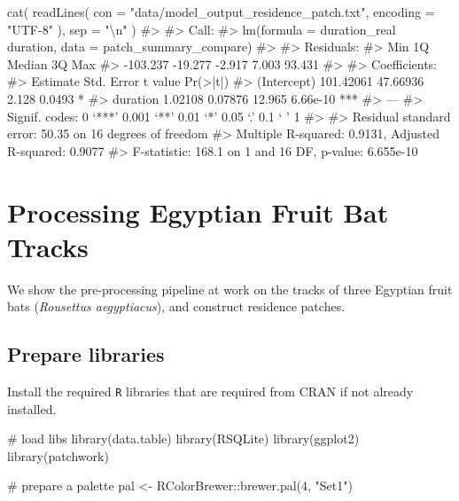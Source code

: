 \documentclass[]{scrreprt}
\newenvironment{Shaded}{}{}
\newcommand{\CharTok}[1]{\textcolor[rgb]{0.00,0.50,0.50}{#1}}
\newcommand{\CommentTok}[1]{\textcolor[rgb]{0.00,0.50,0.00}{#1}}
\newcommand{\DataTypeTok}[1]{#1}
\newcommand{\DecValTok}[1]{#1}
\newcommand{\KeywordTok}[1]{\textcolor[rgb]{0.00,0.00,1.00}{#1}}
\newcommand{\NormalTok}[1]{#1}
\newcommand{\OperatorTok}[1]{#1}
\newcommand{\StringTok}[1]{\textcolor[rgb]{0.00,0.50,0.50}{#1}}
\begin{document}
\begin{Shaded}
\begin{Highlighting}[]
\KeywordTok{cat}\NormalTok{(}
  \KeywordTok{readLines}\NormalTok{(}
    \DataTypeTok{con =} \StringTok{"data/model_output_residence_patch.txt"}\NormalTok{,}
    \DataTypeTok{encoding =} \StringTok{"UTF-8"}
\NormalTok{  ), }\DataTypeTok{sep =} \StringTok{"}\CharTok{\textbackslash{}n}\StringTok{"}
\NormalTok{)}
\CommentTok{#> }
\CommentTok{#> Call:}
\CommentTok{#> lm(formula = duration_real ~ duration, data = patch_summary_compare)}
\CommentTok{#> }
\CommentTok{#> Residuals:}
\CommentTok{#>      Min       1Q   Median       3Q      Max }
\CommentTok{#> -103.237  -19.277   -2.917    7.003   93.431 }
\CommentTok{#> }
\CommentTok{#> Coefficients:}
\CommentTok{#>              Estimate Std. Error t value Pr(>|t|)    }
\CommentTok{#> (Intercept) 101.42061   47.66936   2.128   0.0493 *  }
\CommentTok{#> duration      1.02108    0.07876  12.965 6.66e-10 ***}
\CommentTok{#> ---}
\CommentTok{#> Signif. codes:  0 ‘***’ 0.001 ‘**’ 0.01 ‘*’ 0.05 ‘.’ 0.1 ‘ ’ 1}
\CommentTok{#> }
\CommentTok{#> Residual standard error: 50.35 on 16 degrees of freedom}
\CommentTok{#> Multiple R-squared:  0.9131, Adjusted R-squared:  0.9077 }
\CommentTok{#> F-statistic: 168.1 on 1 and 16 DF,  p-value: 6.655e-10}
\end{Highlighting}
\end{Shaded}

\hypertarget{processing-egyptian-fruit-bat-tracks}{%
\chapter{Processing Egyptian Fruit Bat Tracks}\label{processing-egyptian-fruit-bat-tracks}}

We show the pre-processing pipeline at work on the tracks of three Egyptian fruit bats (\emph{Rousettus aegyptiacus}), and construct residence patches.

\hypertarget{prepare-libraries-1}{%
\section{Prepare libraries}\label{prepare-libraries-1}}

Install the required \texttt{R} libraries that are required from CRAN if not already installed.

\begin{Shaded}
\begin{Highlighting}[]
\CommentTok{# load libs}
\KeywordTok{library}\NormalTok{(data.table)}
\KeywordTok{library}\NormalTok{(RSQLite)}
\KeywordTok{library}\NormalTok{(ggplot2)}
\KeywordTok{library}\NormalTok{(patchwork)}

\CommentTok{# prepare a palette}
\NormalTok{pal <-}\StringTok{ }\NormalTok{RColorBrewer}\OperatorTok{::}\KeywordTok{brewer.pal}\NormalTok{(}\DecValTok{4}\NormalTok{, }\StringTok{"Set1"}\NormalTok{)}
\end{Highlighting}
\end{Shaded}
\end{document}
